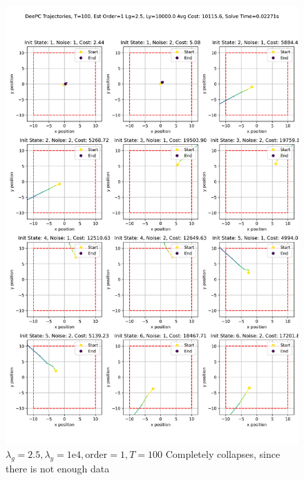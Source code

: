 \documentclass[11pt,a4paper]{article}
\begin{document}
\begin{figure}
    \centering
    \includegraphics[width=0.85\linewidth]{./figures/DeePC_trajectories_100_1_2.5_10000.0.png}
    \caption{$\lambda_g=2.5, \lambda_y=1\mathrm{e}4, \text{order}=1, T=100$ Completely collapses, since there is not enough data}
    \label{fig:enter-label}
\end{figure}
\end{document}
